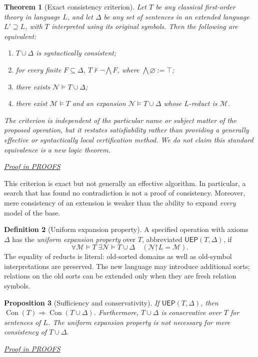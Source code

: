 \documentclass[11pt,letterpaper]{article}
\newtheorem{theorem}{Theorem}[section]
\newtheorem{proposition}[theorem]{Proposition}
\theoremstyle{definition}\newtheorem{definition}[theorem]{Definition}\newtheorem{example}[theorem]{Example}
\theoremstyle{remark}\newtheorem{remark}[theorem]{Remark}
\newcommand{\Con}{\operatorname{Con}}
\newcommand{\prooflink}[1]{\par\noindent\hfill\small\hyperref[#1]{\textit{Proof in PROOFS}}\normalsize}
\providecommand{\restr}{\mathord{\upharpoonright}}
\begin{document}
\begin{theorem}[Exact consistency criterion]\label{induct:thm:exact}
Let \(T\) be any classical first-order theory in language \(L\), and let \(\Delta\) be any set of sentences in an extended language \(L'\supseteq L\), with \(T\) interpreted using its original symbols. Then the following are equivalent:
\begin{enumerate}[label=(\roman*)]
\item \(T\cup\Delta\) is syntactically consistent;
\item for every finite \(F\subseteq\Delta\), \(T\not\vdash\neg\bigwedge F\), where \(\bigwedge\varnothing:=\top\);
\item there exists \(\mathcal N\models T\cup\Delta\);
\item there exist \(\mathcal M\models T\) and an expansion \(\mathcal N\models T\cup\Delta\) whose \(L\)-reduct is \(\mathcal M\).
\end{enumerate}
The criterion is independent of the particular name or subject matter of the proposed operation, but it restates satisfiability rather than providing a generally effective or syntactically local certification method. We do not claim this standard equivalence is a new logic theorem.
\end{theorem}
\label{br:induct:stmt:1}\prooflink{br:induct:proof:1}


This criterion is exact but not generally an effective algorithm. In particular, a search that has found no contradiction is not a proof of consistency. Moreover, mere consistency of an extension is weaker than the ability to expand \emph{every} model of the base.

\begin{definition}[Uniform expansion property]\label{induct:def:uep}
A specified operation with axioms \(\Delta\) has the \emph{uniform expansion property} over \(T\), abbreviated \(\mathsf{UEP}(T,\Delta)\), if
\[
\forall\mathcal M\models T\;\exists\mathcal N\models T\cup\Delta
\quad (\mathcal N\restr L=\mathcal M).
\]
The equality of reducts is literal: old-sorted domains as well as old-symbol interpretations are preserved. The new language may introduce additional sorts; relations on the old sorts can be extended only when they are fresh relation symbols.
\end{definition}

\begin{proposition}[Sufficiency and conservativity]\label{induct:prop:uep}
If \(\mathsf{UEP}(T,\Delta)\), then \(\Con(T)\Rightarrow\Con(T\cup\Delta)\). Furthermore, \(T\cup\Delta\) is conservative over \(T\) for sentences of \(L\). The uniform expansion property is not necessary for mere consistency of \(T\cup\Delta\).
\end{proposition}
\label{br:induct:stmt:2}\prooflink{br:induct:proof:2}
\end{document}
